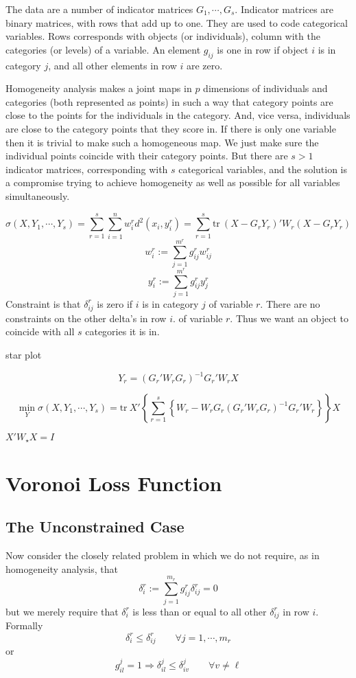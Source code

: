 \documentclass[
  12pt,
]{article}
\begin{document}
The data are a number of indicator matrices \(G_1,\cdots,G_s\). Indicator matrices are binary matrices, with rows that add up to one. They are
used to code categorical variables. Rows corresponds with objects
(or individuals), column with the categories (or levels) of a variable.
An element \(g_{ij}\) is one in row if object \(i\) is in category \(j\),
and all other elements in row \(i\) are zero.

Homogeneity analysis makes a joint maps in \(p\) dimensions of individuals
and categories (both represented as points) in such a way that category points are close to the points for the individuals in the category. And, vice versa, individuals are close to the category points that they score in.
If there is only one variable then it is trivial to make such a
homogeneous map. We just make sure the individual points coincide with
their category points. But there are \(s>1\) indicator matrices, corresponding with \(s\) categorical variables, and the solution is a compromise trying to achieve homogeneity as well as possible for all variables simultaneously.

\[
\sigma(X,Y_1,\cdots,Y_s)=\sum_{r=1}^s\sum_{i=1}^nw_i^rd^2(x_i,y_i^r)=
\sum_{r=1}^s\text{tr}\ (X-G_rY_r)'W_r(X-G_rY_r)
\]
\[
w_i^r:=\sum_{j=1}^{m^r}g_{ij}^rw_{ij}^r
\]
\[
y_{i}^r:=\sum_{j=1}^{m^r}g_{ij}^ry_j^r
\]
Constraint is that \(\delta_{ij}^r\) is zero if \(i\) is in category \(j\) of
variable \(r\). There are no constraints on the other delta's in row \(i\).
of variable \(r\). Thus we want an object to coincide with all \(s\) categories
it is in.

star plot

\[Y_r=(G_r'W_rG_r)^{-1}G_r'W_rX\]

\[
\min_Y\sigma(X,Y_1,\cdots,Y_s)=\text{tr}\ X'\left\{\sum_{r=1}^s\left\{W_r-W_rG_r(G_r'W_rG_r)^{-1}G_r'W_r\right\}\right\}X
\]

\(X'W_\star X=I\)

\section{Voronoi Loss Function}\label{voronoi-loss-function}

\subsection{The Unconstrained Case}\label{the-unconstrained-case}

Now consider the closely related problem in which we do not require,
as in homogeneity analysis, that
\[
\delta_{i}^r:=\sum_{j=1}^{m_r}g_{ij}^r\delta_{ij}^r=0
\]
but we merely require that \(\delta_{i}^r\) is less than or equal to all
other \(\delta_{ij}^r\) in row \(i\). Formally
\[
\delta_{i}^r\leq\delta_{ij}^r\qquad\forall j=1,\cdots,m_r
\]
or
\[
g^j_{il}=1\Rightarrow\delta^j_{il}\leq\delta^j_{iv}\qquad\forall v\not=\ell
\]
\end{document}
